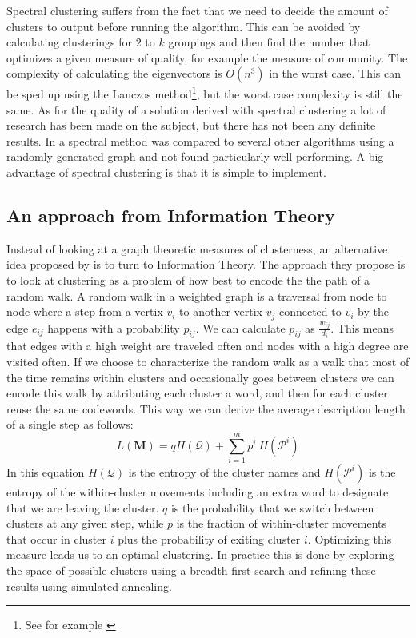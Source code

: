 Spectral clustering suffers from the fact that we need to decide the 
amount of clusters to output before running the algorithm. This can be 
avoided by calculating clusterings for $2$ to $k$ groupings and then 
find the number that optimizes a given measure of quality, for example 
the measure of community. The complexity of calculating the eigenvectors 
is $O(n^3)$ in the worst case. This can be sped up using the Lanczos 
method\footnote{See for example \cite{golub1996}}, but the worst case 
complexity is still the same. As for the quality of a solution derived 
with spectral clustering a lot of research has been made on the subject, 
but there has not been any definite results. In \cite{lancichinetti2009} 
a spectral method was compared to several other algorithms using a 
randomly generated graph and not found particularly well performing.  A 
big advantage of spectral clustering is that it is simple to implement.

\subsection{An approach from Information Theory}
Instead of looking at a graph theoretic measures of clusterness, an 
alternative idea proposed by \cite{rosvall2008} is to turn to 
Information Theory. The approach they propose is to look at clustering 
as a problem of how best to encode the the path of a random walk. A 
random walk in a weighted graph is a traversal from node to node where a 
step from a vertix $v_i$ to another vertix $v_j$ connected to $v_i$ by 
the edge $e_{ij}$ happens with a probability $p_{ij}$. We can calculate 
$p_{ij}$ as $\frac{w_{ij}}{d_i}$. This means that edges with a high 
weight are traveled often and nodes with a high degree are visited 
often. If we choose to characterize the random walk as a walk that most 
of the time remains within clusters and occasionally goes between 
clusters we can encode this walk by attributing each cluster a word, and 
then for each cluster reuse the same codewords. This way we can derive 
the average description length of a single step as follows:
\begin{equation}
	L(\textbf{M}) = q H(\mathcal{Q}) + \sum_{i=1}^{m} p^i \
	H(\mathcal{P}^i)
\end{equation}
In this equation $H(\mathcal{Q})$ is the entropy of the cluster names 
and $H(\mathcal{P}^i)$ is the entropy of the within-cluster movements 
including an extra word to designate that we are leaving the cluster.  
$q$ is the probability that we switch between clusters at any given 
step, while $p$ is the fraction of within-cluster movements that occur 
in cluster $i$ plus the probability of exiting cluster $i$. Optimizing 
this measure leads us to an optimal clustering. In practice this is done 
by exploring the space of possible clusters using a breadth first search 
and refining these results using simulated annealing.

